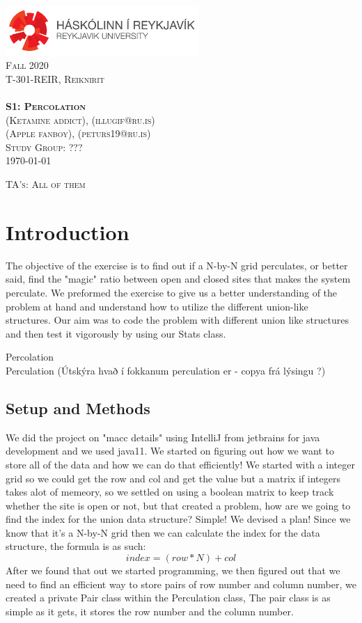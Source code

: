 \documentclass[11pt,a4paper,notitlepage]{article}
\makeatletter
\newcommand{\semester}{Fall 2020}
\newcommand{\coursename}{Reiknirit}
\newcommand{\courseid}{T-301-REIR}
\newcommand{\assignment}{S1: Percolation}
\newcommand{\dateofcompilation}{\today}
\newcommand{\group}{???}                   %
\newcommand{\teachingassistant}{TA's: All of them}   %
\newcommand{\maketitlepage}[1]
{
    \begin{titlepage}

        \begin{center}
            \includegraphics[width=0.55\textwidth]{./rulogo.png}\\[1.5cm]

            \textsc{\huge \semester}\\[0.8cm]

            {\textsc{\Huge \courseid, \coursename}}\\[0.4cm]
            \textsc{\LARGE }\\[2.5cm]

            \textbf{\textsc{\Huge #1}}\\[2.5cm]


            \textsc{\LARGE (Ketamine addict), (illugif@ru.is)}\\  %
            \textsc{\LARGE (Apple fanboy), (peturs19@ru.is)}\\[0.6cm]  %

            \textsc{\LARGE Study Group: \group}\\[1cm] 
            \textsc{\Large \dateofcompilation}


        \end{center}

        \vfill

        \begin{flushleft}
            \textsc{\Large \teachingassistant}
        \end{flushleft}

    \end{titlepage}
}
\newcommand{\explanation}[1]{}  %
\makeatother
\begin{document}
    \maketitlepage{\assignment}

\explanation{Directions on performing the assignment are showed here in italics (like this). These should not be included in the report you submit.}

 \section{Introduction}
\explanation{State the objective(s) of the exercise. Ask yourself: Why did I perform the
  experiment? What did I aim to achieve? Provide background about the subject
  matter, as needed (what are union-find data structures good for?). Include
  the purpose of the different steps.
}
    The objective of the exercise is to find out if a N-by-N grid perculates, or better said, find the "magic" ratio between open and closed sites that makes the system perculate.
    We preformed the exercise to give us a better understanding of the problem at hand and understand how to utilize the different union-like structures.
    Our aim was to code the problem with different union like structures and then test it vigorously by using our Stats class.

    Percolation\\

    Perculation (Útskýra hvað í fokkanum perculation er - copya frá lýsingu ?)

  \subsection{Setup and Methods}
\explanation{ Describe how you performed the exercise. Write about what you actually did
  rather than what you were supposed to do. Be concise;  only give the
  necessary details a person in the same field needs to perform the exercise.
  Write in narrative form (i.e., telling a story) rather than a numbered list
  format. Describe both the set-up (hardware, OS, software, tools) and the testing
  process. Refer to the classes written.}
    We did the project on "macc details" using IntelliJ from jetbrains for java development and we used java11. We started on figuring out how we want to store all of the data and how we can do that efficiently!
    We started with a integer grid so we could get the row and col and get the value but a matrix if integers takes alot of memeory, so we settled on using a boolean matrix to keep track whether the site is open or not,
    but that created a problem, how are we going to find the index for the union data structure? Simple! We devised a plan! Since we know that it's a N-by-N grid then we can calculate the index for the data structure,
    the formula is as such:
    \begin{equation}
        index = (row * N) + col 
    \end{equation}
    After we found that out we started programming, we then figured out that we need to find an efficient way to store pairs of row number and column number, we created a private Pair class within the Perculation class,
    The pair class is as simple as it gets, it stores the row number and the column number.\\
\end{document}
